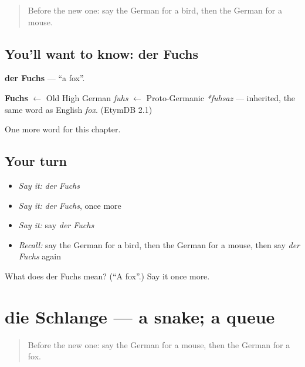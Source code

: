 \label{lesson:GE-C86-fuchs}



\begin{quote}
Before the new one: say the German for a bird, then the German for a mouse.
\end{quote}

\subsection*{You'll want to know: der Fuchs}
\textbf{der Fuchs} — \textquotedblleft{}a fox\textquotedblright{}.

\begin{cousinweb}
\textbf{Fuchs} $\leftarrow$ Old High German \emph{fuhs} $\leftarrow$ Proto-Germanic \emph{*fuhsaz} — inherited, the same word as English \emph{fox}. (EtymDB 2.1)
\end{cousinweb}

\begin{grammarlens}[title={What you've built}]
One more word for this chapter.
\end{grammarlens}

\subsection*{Your turn}
\begin{itemize}
\raggedright
  \item \emph{Say it:} \emph{der Fuchs}
  \item \emph{Say it:} \emph{der Fuchs}, once more
  \item \emph{Say it:} say \emph{der Fuchs}
  \item \emph{Recall:} say the German for a bird, then the German for a mouse, then say \emph{der Fuchs} again
\end{itemize}

\begin{tcolorbox}[breakable,colback=teal!4,colframe=teal!35!black,title={Before you move on}]
What does der Fuchs mean? (\textquotedblleft{}A fox\textquotedblright{}.) Say it once more.
\end{tcolorbox}
\section[die Schlange]{die Schlange — a snake; a queue}

\label{lesson:GE-C86-schlange}



\begin{quote}
Before the new one: say the German for a mouse, then the German for a fox.
\end{quote}

